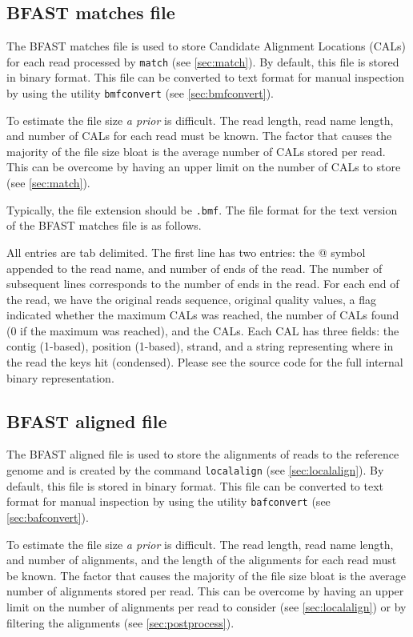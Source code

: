 \documentclass[a4paper,12pt]{book}
\newcommand{\TT}[1]{{\tt #1}} %
\newcommand{\IF}[1]{{\it #1}} %
\newcommand{\BMF}{BFAST matches file} %
\newcommand{\BAF}{BFAST aligned file} %
\begin{document}
\subsection{\BMF{}}
\label{sec:bmf}
The \BMF{} is used to store Candidate Alignment Locations (CALs) for each read processed by \TT{match} (see \autoref{sec:match}).
By default, this file is stored in binary format.
This file can be converted to text format for manual inspection by using the utility \TT{bmfconvert} (see \autoref{sec:bmfconvert}).

To estimate the file size \IF{a prior} is difficult.
The read length, read name length, and number of CALs for each read must be known.
The factor that causes the majority of the file size bloat is the average number of CALs stored per read.
This can be overcome by having an upper limit on the number of CALs to store (see \autoref{sec:match}).

Typically, the file extension should be \TT{.bmf}.
The file format for the text version of the \BMF{} is as follows.

All entries are tab delimited.
The first line has two entries: the @ symbol appended to the read name, and number of ends of the read.
The number of subsequent lines corresponds to the number of ends in the read.
For each end of the read, we have the original reads sequence, original quality values, a flag indicated whether the maximum CALs was reached, the number of CALs found (0 if the maximum was reached), and the CALs.
Each CAL has three fields: the contig (1-based), position (1-based), strand, and a string representing where in the read the keys hit (condensed).
Please see the source code for the full internal binary representation.

\subsection{\BAF{}}
\label{sec:baf} 
The \BAF{} is used to store the alignments of reads to the reference genome and is created by the command \TT{localalign} (see \autoref{sec:localalign}).
By default, this file is stored in binary format.
This file can be converted to text format for manual inspection by using the utility \TT{bafconvert} (see \autoref{sec:bafconvert}).

To estimate the file size \IF{a prior} is difficult.
The read length, read name length, and number of alignments, and the length of the alignments for each read must be known.
The factor that causes the majority of the file size bloat is the average number of alignments stored per read.
This can be overcome by having an upper limit on the number of alignments per read to consider (see \autoref{sec:localalign}) or by filtering the alignments (see \autoref{sec:postprocess}).
\end{document}
